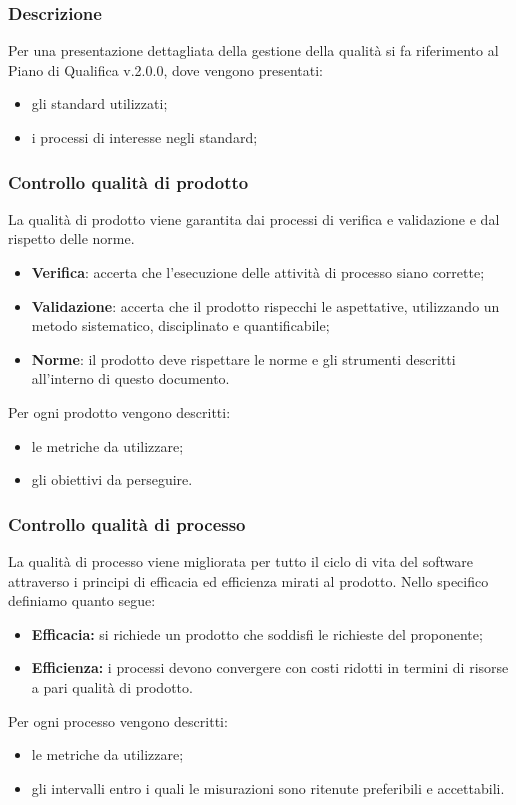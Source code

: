 		\subsubsection{Descrizione}
		Per una presentazione dettagliata della gestione della qualità si fa riferimento al Piano di Qualifica v.2.0.0, dove vengono presentati:
		\begin{itemize}
			\item gli standard utilizzati;
			\item i processi di interesse negli standard;
		\end{itemize}
		\subsubsection{Controllo qualità di prodotto}
		La qualità di prodotto viene garantita dai processi di verifica e validazione e dal rispetto delle norme.
		\begin{itemize}
			\item \textbf{Verifica}: accerta che l’esecuzione delle attività di processo siano corrette;
			\item \textbf{Validazione}: accerta che il prodotto rispecchi le aspettative, utilizzando un metodo sistematico, disciplinato e quantificabile;
			\item \textbf{Norme}:   il  prodotto  deve  rispettare  le  norme  e  gli  strumenti  descritti  all’interno  di  questo documento.
		\end{itemize}
		Per ogni prodotto vengono descritti: 
		\begin{itemize}
			\item le metriche da utilizzare;
			\item gli obiettivi da perseguire.
			\end{itemize}
		\subsubsection{Controllo qualità di processo}
		La qualità di processo viene migliorata per tutto il ciclo di vita del software attraverso i principi di efficacia ed efficienza mirati al prodotto.
			Nello specifico definiamo quanto segue:
			\begin{itemize}
				\item \textbf{Efficacia:} si richiede un prodotto che soddisfi le richieste del proponente;
				\item \textbf{Efficienza:} i processi devono convergere con costi ridotti in termini di risorse a pari qualità di prodotto.
			\end{itemize}
			Per ogni processo vengono descritti: 
			\begin{itemize}
			\item le metriche da utilizzare;
			\item gli intervalli entro i quali le misurazioni sono ritenute preferibili e accettabili.
			\end{itemize}
